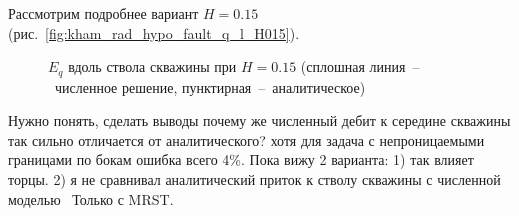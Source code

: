 \documentclass{article}
\begin{document}
Рассмотрим подробнее вариант $H=0.15$ (рис.~\ref{fig:kham_rad_hypo_fault_q_l_H015}).
\begin{figure}[h!]
\centering
\begin{subfigure}{0.45\textwidth}

\caption{}
\label{eq:kham_rad_hypo_fault_q_l_constH015_L05}
\end{subfigure}
\hfill
\begin{subfigure}{0.45\textwidth}

\caption{}
\label{eq:kham_rad_hypo_fault_q_l_constH015_L1}
\end{subfigure}

\begin{subfigure}{0.45\textwidth}

\caption{}
\label{eq:kham_rad_hypo_fault_q_l_constH015_L2}
\end{subfigure}
\hfill
\begin{subfigure}{0.45\textwidth}

\caption{}
\label{eq:kham_rad_hypo_fault_q_l_constH015_L3}
\end{subfigure}

\begin{subfigure}{0.45\textwidth}

\caption{}
\label{eq:kham_rad_hypo_fault_q_l_constH015_L5}
\end{subfigure}
\hfill
\begin{subfigure}{0.45\textwidth}

\caption{}
\label{eq:kham_rad_hypo_fault_q_l_constH015_L10}
\end{subfigure}

\caption{$E_q$ вдоль ствола скважины при $H=0.15$ (сплошная линия~--~численное решение, пунктирная~--~аналитическое)}
\label{fig:kham_rad_hypo_fault_q_l_constH015}
\end{figure}

{\color{red} Нужно понять, сделать выводы почему же численный дебит к середине скважины так сильно отличается от аналитического? хотя для задача с непроницаемыми границами по бокам ошибка всего 4\%. Пока вижу 2 варианта: 1) так влияет торцы. 2) я не сравнивал аналитический приток к стволу скважины с численной моделью~\cite{lit:kham_mazo_uzku_2015} Только с MRST.}
\end{document}
